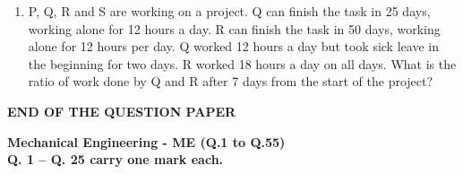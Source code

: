 \documentclass[journal,11pt,onecolumn]{IEEEtran}
\begin{document}
\begin{enumerate}[resume]
\begin{enumerate}
          \end{enumerate}

    \item P, Q, R and S are working on a project. Q can finish the task in 25 days, working alone for 12 hours a day. R can finish the task in 50 days, working alone for 12 hours per day. Q worked 12 hours a day but took sick leave in the beginning for two days. R worked 18 hours a day on all days. What is the ratio of work done by Q and R after 7 days from the start of the project?

          \begin{enumerate}


          \end{enumerate}

\end{enumerate}
\begin{center}
    \Large
    \textbf{END OF THE QUESTION PAPER}
\end{center}

\pagebreak
\large\textbf{Mechanical Engineering - ME (Q.1 to Q.55)}\\

\normalsize\textbf{Q. 1 – Q. 25 carry one mark each.}\\
\end{document}
